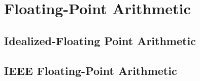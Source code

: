 \chapter{Floating-Point Arithmetic}

\section{Idealized-Floating Point Arithmetic}

\section{IEEE Floating-Point Arithmetic}


